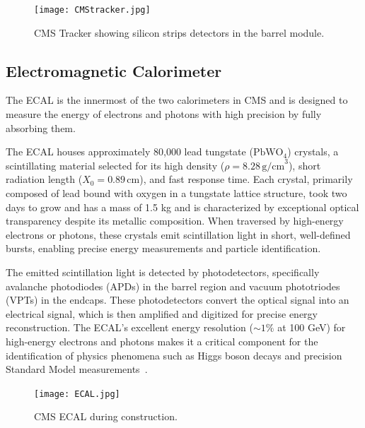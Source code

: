 \begin{figure}[!hbt]
    \begin{center}
        \texttt{[image: CMStracker.jpg]}
        \caption{CMS Tracker showing silicon strips detectors in the barrel module.}
        \label{fig:CMStracker}
    \end{center}
\end{figure}

\subsection{Electromagnetic Calorimeter}

The ECAL is the innermost of the two calorimeters in CMS and is designed to measure the energy of electrons and photons with high precision by fully absorbing them.

The ECAL houses approximately 80,000 lead tungstate (\(\text{PbWO}_4\)) crystals, a scintillating material selected for its high density (\(\rho = 8.28 \, \text{g/cm}^3\)), short radiation length (\(X_0 = 0.89 \, \text{cm}\)), and fast response time. Each crystal, primarily composed of lead bound with oxygen in a tungstate lattice structure, took two days to grow and has a mass of 1.5 kg and is characterized by exceptional optical transparency despite its metallic composition. When traversed by high-energy electrons or photons, these crystals emit scintillation light in short, well-defined bursts, enabling precise energy measurements and particle identification.

The emitted scintillation light is detected by photodetectors, specifically avalanche photodiodes (APDs) in the barrel region and vacuum phototriodes (VPTs) in the endcaps. These photodetectors convert the optical signal into an electrical signal, which is then amplified and digitized for precise energy reconstruction. The ECAL’s excellent energy resolution (\(\sim1\%\) at 100 GeV) for high-energy electrons and photons makes it a critical component for the identification of physics phenomena such as Higgs boson decays and precision Standard Model measurements~\cite{CMS:ECALPerf, CMS:ECALTDR, CMS:JINST}.

\begin{figure}[!hbt]
    \begin{center}
        \texttt{[image: ECAL.jpg]}
        \caption{CMS ECAL during construction.}
        \label{fig:ECAL}
    \end{center}
\end{figure}

